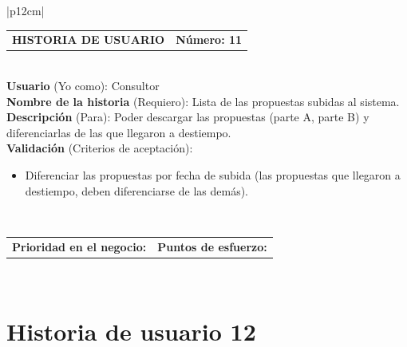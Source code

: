 \documentclass[11pt,letterpaper]{report}
\begin{document}
	\begin{center}	
		\begin{tabular}{|p{12cm}|}
			\hline
			\begin{tabular}{c|c}
				\textbf{HISTORIA DE USUARIO} & \textbf{Número: 11} \\
			\end{tabular} \\ \hline
			\textbf{Usuario} (Yo como): Consultor \\ \hline
			\textbf{Nombre de la historia} (Requiero): Lista de las propuestas subidas al sistema. \\ \hline
			\textbf{Descripción} (Para): Poder descargar las propuestas (parte A, parte B) y diferenciarlas de las que llegaron a destiempo. \\ \hline
			\textbf{Validación} (Criterios de aceptación): \\
			\begin{minipage}{12cm}
				\begin{itemize}
					\item Diferenciar las propuestas por fecha de subida (las propuestas que llegaron a destiempo, deben diferenciarse de las demás).
				\end{itemize}
			\end{minipage} \\ \hline
			\begin{tabular}{c|c}
				\textbf{Prioridad en el negocio: } & \textbf{Puntos de esfuerzo: } \\
			\end{tabular} \\ \hline
		\end{tabular}
	\end{center}
	
	\section{Historia de usuario 12}
	
\end{document}
